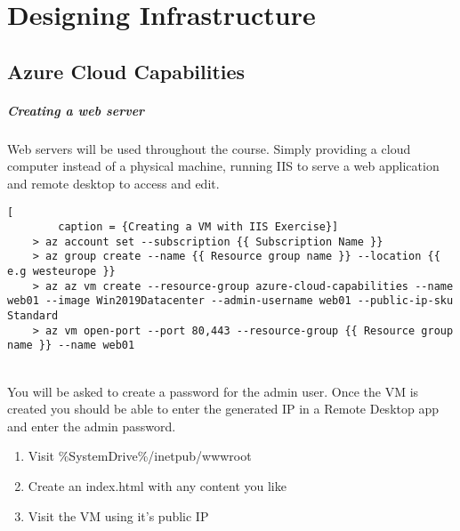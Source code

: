\documentclass[a4paper,14pt]{report}
\author{Hugh McKenna}
\begin{document}
    \chapter{Designing Infrastructure}


    \section{Azure Cloud Capabilities}

    \paragraph{Creating a web server}
    Web servers will be used throughout the course. Simply providing a cloud computer instead of a
    physical machine, running IIS to serve a web application and remote desktop to access and edit.

    \begin{lstlisting}[
        caption = {Creating a VM with IIS Exercise}]
    > az account set --subscription {{ Subscription Name }}
    > az group create --name {{ Resource group name }} --location {{ e.g westeurope }}
    > az az vm create --resource-group azure-cloud-capabilities --name web01 --image Win2019Datacenter --admin-username web01 --public-ip-sku Standard
    > az vm open-port --port 80,443 --resource-group {{ Resource group name }} --name web01
    \end{lstlisting}

    \\
    You will be asked to create a password for the admin user. Once the VM is created you should
    be able to enter the generated IP in a Remote Desktop app and enter the admin password.
    \begin{enumerate}
        \item Visit \%SystemDrive\%/inetpub/wwwroot
        \item Create an index.html with any content you like
        \item Visit the VM using it's public IP
    \end{enumerate}
\end{document}
